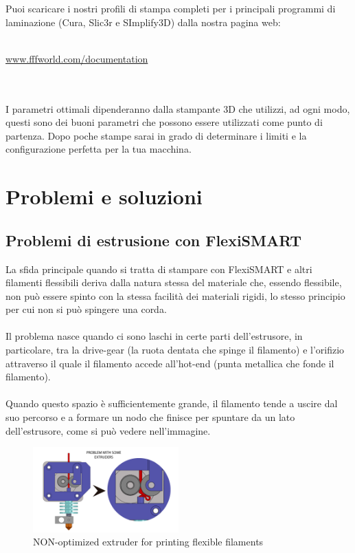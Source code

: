 \documentclass[11pt,a4paper]{article}
\begin{document}
Puoi scaricare i nostri profili di stampa completi per i principali programmi di laminazione  (Cura, Slic3r e SImplify3D) dalla nostra pagina web:
\\\\
\centerline{ {\huge \url{www.fffworld.com/documentation} } }
\\\\
I parametri ottimali dipenderanno dalla stampante 3D che utilizzi, ad ogni modo, questi sono dei buoni parametri che possono essere utilizzati come punto di partenza. Dopo poche stampe sarai in grado di determinare i limiti e la configurazione perfetta per la tua macchina.
\section{Problemi e soluzioni}
	\subsection{Problemi di estrusione con FlexiSMART}
La sfida principale quando si tratta di stampare con FlexiSMART e altri filamenti flessibili deriva dalla natura stessa del materiale che, essendo flessibile, non può essere spinto con la stessa facilità dei materiali rigidi, lo stesso principio per cui non si può spingere una corda.
\\\\
Il problema nasce quando ci sono laschi in certe parti dell'estrusore, in particolare, tra la drive-gear (la ruota dentata che spinge il filamento) e l'orifizio attraverso il quale il filamento accede all'hot-end (punta metallica che fonde il filamento).
\\\\
Quando questo spazio è sufficientemente grande, il filamento tende a uscire dal suo percorso e a formare un nodo che finisce per spuntare da un lato dell'estrusore, come si può vedere nell'immagine. 
\begin{figure}[H]
\centering
\includegraphics[width=0.5\textwidth,cfbox=azul_marcos 4pt 0pt]{FOTOS/NUDOS1}
\caption*{NON-optimized extruder for printing flexible filaments}
\end{figure}
\end{document}
